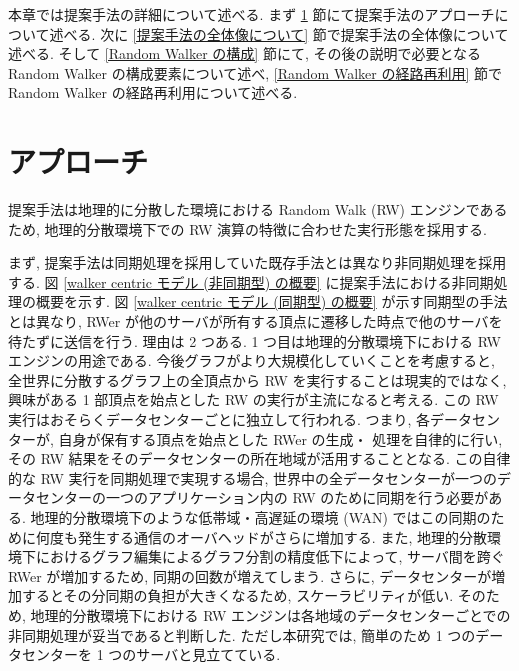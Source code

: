 本章では提案手法の詳細について述べる. まず \ref{概要} 節にて提案手法のアプローチについて述べる. 次に \ref{提案手法の全体像について} 節で提案手法の全体像について述べる. そして \ref{Random Walker の構成} 節にて, その後の説明で必要となる Random Walker の構成要素について述べ, \ref{Random Walker の経路再利用} 節で Random Walker の経路再利用について述べる.

\section{アプローチ}\label{概要}

提案手法は地理的に分散した環境における Random Walk (RW) エンジンであるため, 地理的分散環境下での RW 演算の特徴に合わせた実行形態を採用する. 

まず, 提案手法は同期処理を採用していた既存手法とは異なり非同期処理を採用する. 図 \ref{walker centric モデル (非同期型) の概要} に提案手法における非同期処理の概要を示す. 図 \ref{walker centric モデル (同期型) の概要} が示す同期型の手法とは異なり, RWer が他のサーバが所有する頂点に遷移した時点で他のサーバを待たずに送信を行う. 理由は 2 つある. 
1 つ目は地理的分散環境下における RW エンジンの用途である. 今後グラフがより大規模化していくことを考慮すると, 全世界に分散するグラフ上の全頂点から RW を実行することは現実的ではなく, 興味がある 1 部頂点を始点とした RW の実行が主流になると考える. この RW 実行はおそらくデータセンターごとに独立して行われる. つまり, 各データセンターが, 自身が保有する頂点を始点とした RWer の生成・ 処理を自律的に行い, その RW 結果をそのデータセンターの所在地域が活用することとなる. この自律的な RW 実行を同期処理で実現する場合, 世界中の全データセンターが一つのデータセンターの一つのアプリケーション内の RW のために同期を行う必要がある. 地理的分散環境下のような低帯域・高遅延の環境 (WAN) ではこの同期のために何度も発生する通信のオーバヘッドがさらに増加する. また, 地理的分散環境下におけるグラフ編集によるグラフ分割の精度低下によって, サーバ間を跨ぐ RWer が増加するため, 同期の回数が増えてしまう. さらに, データセンターが増加するとその分同期の負担が大きくなるため, スケーラビリティが低い. そのため, 地理的分散環境下における RW エンジンは各地域のデータセンターごとでの非同期処理が妥当であると判断した. ただし本研究では, 簡単のため 1 つのデータセンターを 1 つのサーバと見立てている. 

